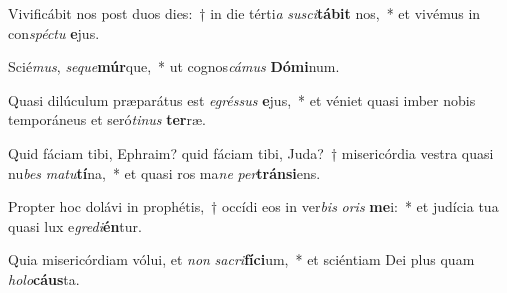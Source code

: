 \item Vivificábit nos post duos dies:~† in die térti\textit{a} \textit{su}\textit{sci}\textbf{tá}\textbf{bit} nos,~* et vivémus in con\textit{spéc}\textit{tu} \textbf{e}jus.
\item Scié\textit{mus}, \textit{se}\textit{que}\textbf{múr}que,~* ut cognos\textit{cá}\textit{mus} \textbf{Dó}\textbf{mi}num.
\item Quasi dilúculum præparátus est \textit{e}\textit{grés}\textit{sus} \textbf{e}jus,~* et véniet quasi imber nobis temporáneus et seró\textit{ti}\textit{nus} \textbf{ter}ræ.
\item Quid fáciam tibi, Ephraim? quid fáciam tibi, Juda?~† misericórdia vestra quasi nu\textit{bes} \textit{ma}\textit{tu}\textbf{tí}na,~* et quasi ros ma\textit{ne} \textit{per}\textbf{tráns}\textbf{i}ens.
\item Propter hoc dolávi in prophétis,~† occídi eos in ver\textit{bis} \textit{o}\textit{ris} \textbf{me}i:~* et judícia tua quasi lux e\textit{gre}\textit{di}\textbf{én}tur.
\item Quia misericórdiam vólui, et \textit{non} \textit{sa}\textit{cri}\textbf{fí}\textbf{ci}um,~* et sciéntiam Dei plus quam \textit{ho}\textit{lo}\textbf{cáus}ta.

